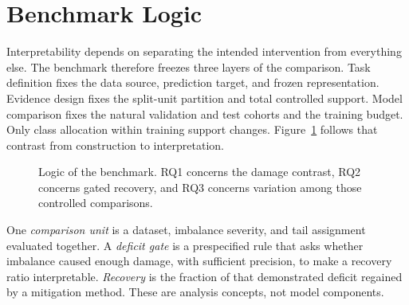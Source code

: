 \documentclass[11pt]{article}
\begin{document}
\section{Benchmark Logic}
\label{sec:design}
Interpretability depends on separating the intended intervention from everything else. The benchmark therefore freezes three layers of the comparison. Task definition fixes the data source, prediction target, and frozen representation. Evidence design fixes the split-unit partition and total controlled support. Model comparison fixes the natural validation and test cohorts and the training budget. Only class allocation within training support changes. Figure~\ref{fig:study-logic} follows that contrast from construction to interpretation.

\begin{figure}[H]
  \centering
  \caption{Logic of the benchmark. RQ1 concerns the damage contrast, RQ2 concerns gated recovery, and RQ3 concerns variation among those controlled comparisons.}
  \label{fig:study-logic}
\end{figure}

\noindent One \emph{comparison unit} is a dataset, imbalance severity, and tail assignment evaluated together. A \emph{deficit gate} is a prespecified rule that asks whether imbalance caused enough damage, with sufficient precision, to make a recovery ratio interpretable. \emph{Recovery} is the fraction of that demonstrated deficit regained by a mitigation method. These are analysis concepts, not model components.
\end{document}

